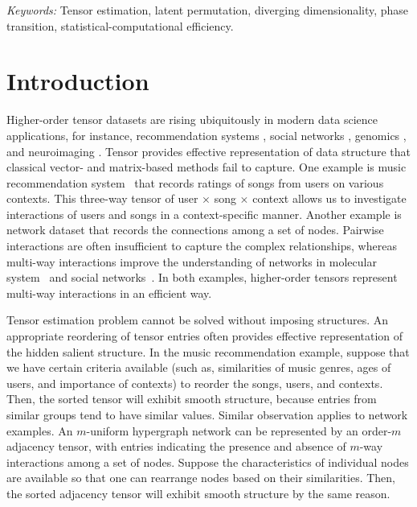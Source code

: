 \documentclass[12pt]{article}
\theoremstyle{definition}
\begin{document}
\noindent%
{\it Keywords:} Tensor estimation, latent permutation, diverging dimensionality, phase transition, statistical-computational efficiency. 
\vfill

\newpage
{} %
\section{Introduction}
\label{sec:intro}
Higher-order tensor datasets are rising ubiquitously in modern data science applications, for instance, recommendation systems \citep{baltrunas2011incarmusic,bi2018multilayer}, social networks \citep{bickel2009nonparametric},
genomics \citep{hore2016tensor}, and neuroimaging \citep{zhou2013tensor}.
Tensor provides effective representation of data structure that classical vector- and matrix-based methods fail to capture. 
One example is music recommendation system~\citep{baltrunas2011incarmusic} that records ratings of songs from users on various contexts. This three-way tensor of user $\times$ song $\times$ context allows us to investigate interactions of users and songs in a context-specific manner.
Another example is network dataset that records the connections among a set of nodes. Pairwise interactions are often insufficient to capture the complex relationships, whereas multi-way interactions improve the understanding of networks in molecular system~\citep{young2018universality} and social networks~\cite{han2020exact}. In both examples, higher-order tensors represent multi-way interactions in an efficient way.


Tensor estimation problem cannot be solved without imposing structures. An appropriate reordering of tensor entries often provides effective representation of the hidden salient structure. In the music recommendation example, suppose that we have certain criteria available (such as, similarities of music genres, ages of users, and importance of contexts) to reorder the songs, users, and contexts. Then, the sorted tensor will exhibit smooth structure, because entries from similar groups tend to have similar values. Similar observation applies to network examples. An $m$-uniform hypergraph network can be represented by an order-$m$ adjacency tensor, with entries indicating the presence and absence of $m$-way interactions among a set of nodes. Suppose the characteristics of individual nodes are available so that one can rearrange nodes based on their similarities. Then, the sorted adjacency tensor will exhibit smooth structure by the same reason.
\end{document}
